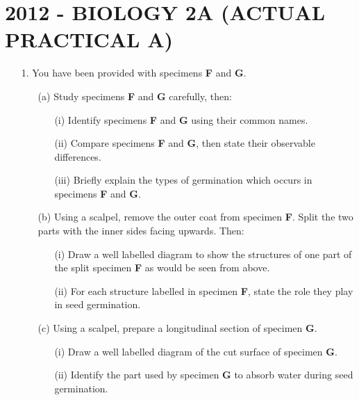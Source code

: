 \section{2012 - BIOLOGY 2A (ACTUAL PRACTICAL A)}

\begin{enumerate}
\item[1.] You have been provided with specimens \textbf{F} and \textbf{G}.
\begin{enumerate}
\item[(a)] Study specimens \textbf{F} and \textbf{G} carefully, then:
\begin{enumerate}
\item[(i)] Identify specimens \textbf{F} and \textbf{G} using their common names.
\item[(ii)] Compare specimens \textbf{F} and \textbf{G}, then state their observable differences.
\item[(iii)] Briefly explain the types of germination which occurs in specimens \textbf{F} and \textbf{G}.
\end{enumerate}
\item[(b)] Using a scalpel, remove the outer coat from specimen \textbf{F}. Split the two parts with the inner sides facing upwards. Then:
\begin{enumerate}
\item[(i)] Draw a well labelled diagram to show the structures of one part of the split specimen \textbf{F} as would be seen from above.
\item[(ii)] For each structure labelled in specimen \textbf{F}, state the role they play in seed germination.
\end{enumerate}
\item[(c)] Using a scalpel, prepare a longitudinal section of specimen \textbf{G}.
\begin{enumerate}
\item[(i)] Draw a well labelled diagram of the cut surface of specimen \textbf{G}.
\item[(ii)] Identify the part used by specimen \textbf{G} to absorb water during seed germination.
\end{enumerate}
\end{enumerate}


\end{enumerate}
